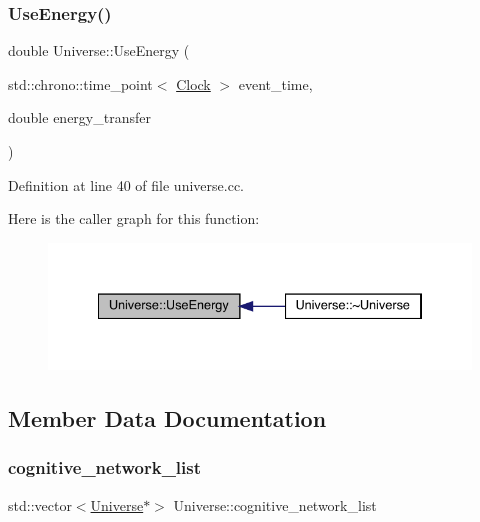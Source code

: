 \subsubsection{\texorpdfstring{Use\+Energy()}{UseEnergy()}}
{\footnotesize\ttfamily double Universe\+::\+Use\+Energy (\begin{DoxyParamCaption}\item[{std\+::chrono\+::time\+\_\+point$<$ \hyperlink{universe_8h_a0ef8d951d1ca5ab3cfaf7ab4c7a6fd80}{Clock} $>$}]{event\+\_\+time,  }\item[{double}]{energy\+\_\+transfer }\end{DoxyParamCaption})}



Definition at line 40 of file universe.\+cc.

Here is the caller graph for this function\+:
\nopagebreak
\begin{figure}[H]
\begin{center}
\leavevmode
\includegraphics[width=334pt]{class_universe_a63e878aaf03f1800b255e9a089a72a8b_icgraph}
\end{center}
\end{figure}


\subsection{Member Data Documentation}
\mbox{\label{class_universe_a7a0e9796ff0d650a8b1fbde5fa5b761f}} 
\subsubsection{\texorpdfstring{cognitive\+\_\+network\+\_\+list}{cognitive\_network\_list}}
{\footnotesize\ttfamily std\+::vector$<$\hyperlink{class_universe}{Universe}$\ast$$>$ Universe\+::cognitive\+\_\+network\+\_\+list\hspace{0.3cm}{\ttfamily [protected]}}




